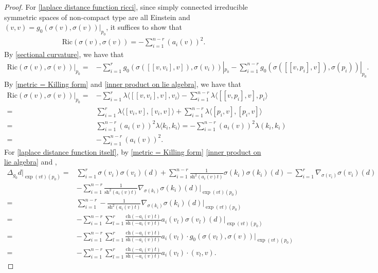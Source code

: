 \documentclass[12pt]{amsart}
\begin{document}
\begin{proof}
For \eqref{laplace distance function ricci}, since simply connected irreducible symmetric spaces of non-compact type are all Einstein and $(v, v) = g_0(\sigma(v), \sigma(v))|_{p_0}$, it suffices to show that 
\begin{align*}
    \mathrm{Ric}(\sigma(v), \sigma(v)) = - \sum_{i = 1}^{n - r} (a_i(v))^2.
\end{align*}
By \eqref{sectional curvature}, we have that 
\begin{align*}
    \mathrm{Ric}(\sigma(v),\sigma(v))|_{p_0} =& -\sum_{i = 1}^{r}g_0(\sigma([[v,v_i], v]),\sigma(v_i))|_{p_0} - \sum_{i=1}^{n - r}g_0(\sigma([[v,p_i],v]), \sigma(p_i))|_{p_0}.
\end{align*}
By \eqref{metric = Killing form} and \eqref{inner product on lie algebra}, we have that 
\begin{align*}
    \mathrm{Ric}(\sigma(v),\sigma(v))|_{p_0} 
    =& -\sum_{i = 1}^{r}\lambda\langle[[v,v_i], v],v_i\rangle - \sum_{i=1}^{n - r}\lambda \langle [[v,p_i],v], p_i \rangle \\
    =& \sum_{i = 1}^{r}\lambda\langle[v_i,v],[v_i,v]\rangle+\sum_{i = 1}^{n - r}\lambda \langle [p_i,v],[p_i,v] \rangle \\
    =& \sum_{i=1}^{n-r}(a_i(v))^2\lambda \langle k_i, k_i \rangle = -\sum_{i=1}^{n-r}(a_i(v))^2\lambda ( k_i, k_i) \\ 
    =& -\sum_{i = 1}^{n - r} (a_i(v))^2.
\end{align*}
For \eqref{laplace distance function itself}, by \eqref{metric = Killing form} \eqref{inner product on lie algebra} and ,
\begin{align*}
    \Delta_{g_0} d|_{\exp(vt)(p_0)} =& \sum_{i = 1}^{r} \sigma(v_i)\sigma(v_i)(d) + \sum_{i = 1}^{n - r}\frac{1}{\mathrm{sh}^2(a_i(v)t)}\sigma(k_{i})\sigma(k_{i})(d) - \sum_{i = 1}^{r}\nabla_{\sigma(v_i)}\sigma(v_i)(d)\\
    &- \sum_{i =1}^{n - r}\frac{1}{\mathrm{sh}^2(a_i(v)t)}\nabla_{\sigma(k_i)}\sigma(k_i)(d)|_{\exp(vt)(p_0)}\\
    =& \sum_{i = 1}^{n - r}-\frac{1}{\mathrm{sh}^2(a_i(v)t)}\nabla_{\sigma(k_i)}\sigma(k_i)(d)|_{\exp(vt)(p_0)}\\
    =& -\sum_{i = 1}^{n - r}\sum_{l = 1}^{r}\frac{\mathrm{ch}(-a_i(v)t)}{\mathrm{sh}(-a_i(v)t)}a_i(v_{l})\sigma(v_{l})(d)|_{\exp(vt)(p_0)}\\
    =& -\sum_{i = 1}^{n - r}\sum_{l = 1}^{r}\frac{\mathrm{ch}(-a_i(v)t)}{\mathrm{sh}(-a_i(v)t)}a_i(v_{l})\cdot g_0(\sigma(v_l), \sigma(v))|_{\exp(vt)(p_0)}\\
    =& -\sum_{i = 1}^{n - r}\sum_{l = 1}^{r}\frac{\mathrm{ch}(-a_i(v)t)}{\mathrm{sh}(-a_i(v)t)}a_i(v_{l})\cdot (v_l, v).
\end{align*} 
\end{proof}
\end{document}
